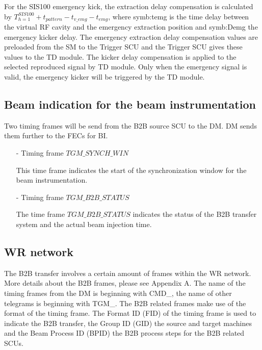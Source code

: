 For the SIS100 emergency kick, the extraction delay compensation is calculated by $T_{h=1}^{SIS100} + t_{pattern} - t_{v\_emg} - t_{emg}$, where \gls{symb:temg} is the time delay between the virtual RF cavity and the emergency extraction position and \gls{symb:Demg} the emergency kicker delay. The emergency extraction delay compensation values are preloaded from the SM to the Trigger SCU and the Trigger SCU gives these values to the TD module. The kicker delay compensation is applied to the selected reproduced signal by TD module. Only when the emergency signal is valid, the emergency kicker will be triggered by the TD module.


\subsection{Beam indication for the beam instrumentation}

Two timing frames will be send from the B2B source SCU to the DM. DM sends them further to the FECs for BI.
\begin{itemize}
\item[-] Timing frame $TGM\_SYNCH\_WIN$

This time frame indicates the start of the synchronization window for the beam instrumentation.

\item[-] Timing frame $TGM\_B2B\_STATUS$

The time frame $TGM\_B2B\_STATUS$ indicates the status of the B2B transfer system and the actual beam injection time. 
\end{itemize}

\subsection{WR network}

The B2B transfer involves a certain amount of frames within the WR network. More details about the B2B frames, please see Appendix A. The name of the timing frames from the DM is beginning with CMD\_, the name of other telegrams is beginning with TGM\_. The B2B related frames make use of the format of the timing frame. The Format ID (\gls{FID}) of the timing frame is used to indicate the B2B transfer, the Group ID (\gls{GID}) the source and target machines and the Beam Process ID (\gls{BPID}) the B2B process steps for the B2B related SCUs. 

